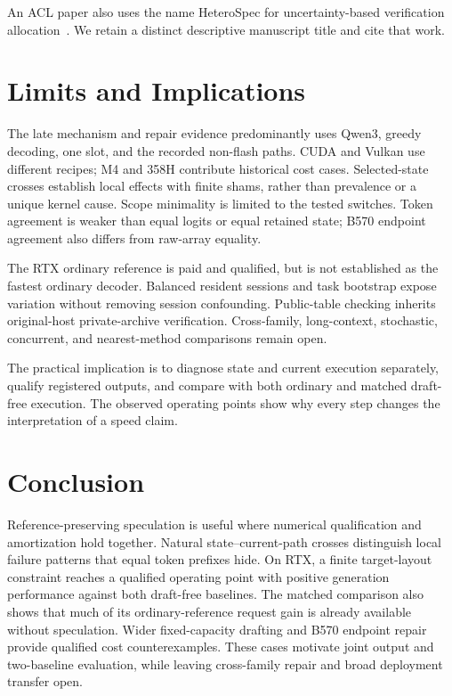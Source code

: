 \documentclass{article}
\begin{document}
An ACL paper also uses the name HeteroSpec for uncertainty-based verification allocation~\cite{aclheterospec}. We retain a distinct descriptive manuscript title and cite that work.

\section{Limits and Implications}
The late mechanism and repair evidence predominantly uses Qwen3, greedy decoding, one slot, and the recorded non-flash paths. CUDA and Vulkan use different recipes; M4 and 358H contribute historical cost cases. Selected-state crosses establish local effects with finite shams, rather than prevalence or a unique kernel cause. Scope minimality is limited to the tested switches. Token agreement is weaker than equal logits or equal retained state; B570 endpoint agreement also differs from raw-array equality.

The RTX ordinary reference is paid and qualified, but is not established as the fastest ordinary decoder. Balanced resident sessions and task bootstrap expose variation without removing session confounding. Public-table checking inherits original-host private-archive verification. Cross-family, long-context, stochastic, concurrent, and nearest-method comparisons remain open.

The practical implication is to diagnose state and current execution separately, qualify registered outputs, and compare with both ordinary and matched draft-free execution. The observed operating points show why every step changes the interpretation of a speed claim.

\section{Conclusion}
Reference-preserving speculation is useful where numerical qualification and amortization hold together. Natural state--current-path crosses distinguish local failure patterns that equal token prefixes hide. On RTX, a finite target-layout constraint reaches a qualified operating point with positive generation performance against both draft-free baselines. The matched comparison also shows that much of its ordinary-reference request gain is already available without speculation. Wider fixed-capacity drafting and B570 endpoint repair provide qualified cost counterexamples. These cases motivate joint output and two-baseline evaluation, while leaving cross-family repair and broad deployment transfer open.

\label{maintextend}
\clearpage

\end{document}
